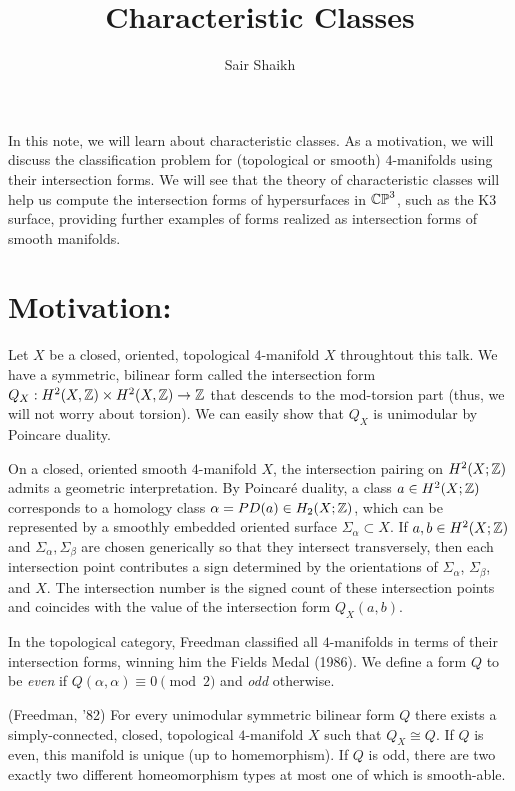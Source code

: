 \documentclass[12pt]{article}
\begin{document}
\title{Characteristic Classes}
\date{}
\author{Sair Shaikh}
\maketitle


In this note, we will learn about characteristic classes. As a motivation, we will discuss the classification problem for (topological or smooth) $4$-manifolds using their intersection forms. We will see that the theory of characteristic classes will help us compute the intersection forms of hypersurfaces in $\mathbb{CP}^3$, such as the K3 surface, providing further examples of forms realized as intersection forms of smooth manifolds. 

\section{Motivation:}

Let $X$ be a closed, oriented, topological $4$-manifold $X$ throughtout this talk. We have a symmetric, bilinear form called the intersection form $Q_X: H^2(X, \mathbb Z) \times H^2(X, \mathbb Z) \to \mathbb Z$ that descends to the mod-torsion part (thus, we will not worry about torsion). We can easily show that $Q_X$ is unimodular by Poincare duality. 

\begin{remark}
On a closed, oriented smooth $4$-manifold $X$, the intersection pairing on $H^2(X;\mathbb Z)$ admits a geometric interpretation. By Poincaré duality, a class $a \in H^2(X;\mathbb Z)$ corresponds to a homology class $\alpha = PD(a) \in H_2(X;\mathbb Z)$, which can be represented by a smoothly embedded oriented surface $\Sigma_\alpha \subset X$. If $a,b \in H^2(X;\mathbb Z)$ and $\Sigma_\alpha,\Sigma_\beta$ are chosen generically so that they intersect transversely, then each intersection point contributes a sign determined by the orientations of $\Sigma_\alpha$, $\Sigma_\beta$, and $X$. The intersection number is the signed count of these intersection points and coincides with the value of the intersection form $Q_X(a,b)$.
\end{remark}

In the topological category, Freedman classified all $4$-manifolds in terms of their intersection forms, winning him the Fields Medal (1986). We define a form $Q$ to be \emph{even} if $Q(\alpha, \alpha) \equiv 0 \pmod{2}$ and \emph{odd} otherwise.

\begin{theorem}(Freedman, '82)
    For every unimodular symmetric bilinear form $Q$ there exists a simply-connected, closed, topological $4$-manifold $X$ such that $Q_X \cong Q$. If $Q$ is even, this manifold is unique (up to homemorphism). If $Q$ is odd, there are two exactly two different homeomorphism types at most one of which is smooth-able.
\end{theorem}
\end{document}
